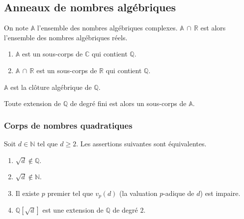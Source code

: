   \subsection{Anneaux de nombres algébriques}


  \begin{notation}
    On note $\mathbb{A}$ l'ensemble des nombres algébriques complexes. $\mathbb{A} \, \cap \, \mathbb{R}$ est alors l'ensemble des nombres algébriques réels.
  \end{notation}

  \begin{theorem}
    \begin{enumerate}[label={\bfseries(\roman*)}]
      \item $\mathbb{A}$ est un sous-corps de $\mathbb{C}$ qui contient $\mathbb{Q}$.
      \item $\mathbb{A} \, \cap \, \mathbb{R}$ est un sous-corps de $\mathbb{R}$ qui contient $\mathbb{Q}$.
    \end{enumerate}
  \end{theorem}


  \begin{corollary}
    $\mathbb{A}$ est la clôture algébrique de $\mathbb{Q}$.
  \end{corollary}

  \begin{remark}
    Toute extension de $\mathbb{Q}$ de degré fini est alors un sous-corps de $\mathbb{A}$.
  \end{remark}

  \subsubsection{Corps de nombres quadratiques}


  \begin{proposition}
    Soit $d \in \mathbb{N}$ tel que $d \geq 2$. Les assertions suivantes sont équivalentes.
    \begin{enumerate}[label={\bfseries(\roman*)}]
      \item $\sqrt{d} \notin \mathbb{Q}$.
      \item $\sqrt{d} \notin \mathbb{N}$.
      \item Il existe $p$ premier tel que $v_p(d)$ (la valuation $p$-adique de $d$) est impaire.
      \item $\mathbb{Q}[\sqrt{d}]$ est une extension de $\mathbb{Q}$ de degré $2$.
    \end{enumerate}
  \end{proposition}

